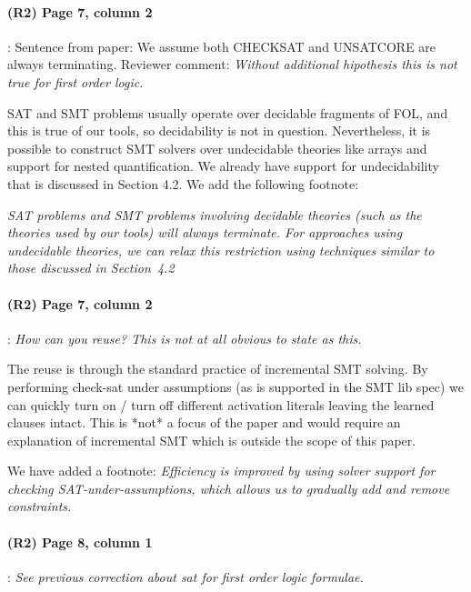 \documentclass{article}
\begin{document}
\paragraph{(R2) Page 7, column 2}: Sentence from paper: We assume both CHECKSAT and UNSATCORE are always terminating.  Reviewer comment: 
\textit{Without additional hipothesis this is not true
for first order logic.}
\vspace{0.05in}

\noindent SAT and SMT problems usually operate over decidable fragments of FOL, and this is true of our tools, so decidability is not in question.  Nevertheless, it is possible to construct SMT solvers over undecidable theories like arrays and support for nested quantification. We already have support for undecidability that is discussed in Section 4.2. We add the following footnote:

\textit{SAT problems and SMT problems involving decidable theories (such as the theories used by our tools) will always terminate.  For approaches using undecidable theories, we can relax this restriction using  techniques similar to those discussed in Section~4.2}


\paragraph{(R2) Page 7, column 2}: \textit{How can you reuse? This is not at all obvious to state as this.}
\vspace{0.05in}

\noindent The reuse is through the standard practice of incremental SMT solving. By performing check-sat under assumptions (as is supported in the SMT lib spec) we can quickly turn on / turn off different activation literals leaving the learned clauses intact. This is
*not* a focus of the paper and would require an explanation of incremental SMT which is outside the scope of this paper.

We have added a footnote: \textit{Efficiency is improved by using solver support for checking SAT-under-assumptions, which allows us to gradually add and remove constraints.}


\paragraph{(R2) Page 8, column 1}: \textit{See previous correction about sat for first
order logic formulae.}
\vspace{0.05in}
\end{document}
